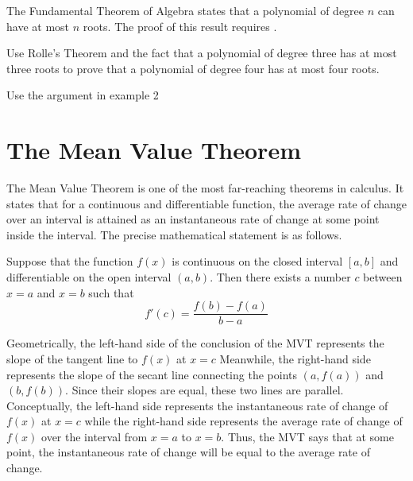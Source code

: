 \documentclass[handout]{ximera}
\begin{document}
\begin{remark} The Fundamental Theorem of Algebra states that a polynomial of degree $n$ can have at most $n$ roots.
	The proof of this result requires .
\end{remark}

\begin{problem}[problem 2]
Use Rolle's Theorem and the fact that a polynomial of degree three has at most three 
roots to prove that a polynomial of degree four has at most four roots.
\begin{hint} 
	Use the argument in example 2
\end{hint}
\end{problem}

\section{The Mean Value Theorem}


The Mean Value Theorem is one of the most far-reaching theorems in calculus. It states that for a continuous 
and differentiable function, the average rate of change over an interval is attained as an 
instantaneous rate of change at some point inside the interval. The precise mathematical statement is as follows.\\

\begin{theorem}
Suppose that the function $f(x)$ is continuous on the closed interval $[a,b]$ and differentiable on the 
open interval $(a,b)$. Then there exists a number $c$ between $x = a$ and $x = b$ such that
\[f'(c) = \frac{f(b) - f(a)}{b-a}\]

\end{theorem}



Geometrically, the left-hand side of the conclusion of the MVT represents the slope of the tangent line to $f(x)$ at $x = c$ 
Meanwhile, the right-hand side represents the slope of the secant line connecting the points $(a, f(a))$ and $(b, f(b))$. 
Since their slopes are equal, these two lines are parallel.
Conceptually, the left-hand side represents the instantaneous rate of change of $f(x)$ at $x = c$ while the
right-hand side represents the average rate of change of $f(x)$ over the interval from $x=a$ to $x=b$. 
Thus, the MVT says that at some point, the instantaneous rate of change will be equal to the average rate of change.
\end{document}

